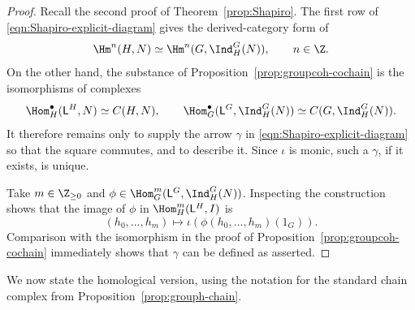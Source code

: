 \begin{proof}
	Recall the second proof of Theorem~\ref{prop:Shapiro}. The first row of
	\eqref{eqn:Shapiro-explicit-diagram} gives the derived-category form of
	\[ \Hm^n(H,N)\simeq\Hm^n(G,\Ind^G_H(N)),\qquad n\in\Z. \]
	On the other hand, the substance of
	Proposition~\ref{prop:groupcoh-cochain} is the isomorphisms of complexes
	\[ \Hom^\bullet_H(\mathsf{L}^H,N)\simeq C(H,N),\qquad
	\Hom^\bullet_G(\mathsf{L}^G,\Ind^G_H(N))
	\simeq C(G,\Ind^G_H(N)). \]
	It therefore remains only to supply the arrow $\gamma$ in
	\eqref{eqn:Shapiro-explicit-diagram} so that the square commutes, and to
	describe it. Since $\iota$ is monic, such a $\gamma$, if it exists, is
	unique.

	Take $m\in\Z_{\geq0}$ and
	$\phi\in\Hom^m_G(\mathsf{L}^G,\Ind^G_H(N))$. Inspecting the construction
	shows that the image of $\phi$ in $\Hom^m_H(\mathsf{L}^H,I)$ is
	\[ (h_0,\ldots,h_m)\mapsto
	\iota\left(\phi(h_0,\ldots,h_m)(1_G)\right). \]
	Comparison with the isomorphism in the proof of
	Proposition~\ref{prop:groupcoh-cochain} immediately shows that $\gamma$
	can be defined as asserted.
\end{proof}

We now state the homological version, using the notation for the standard
chain complex from Proposition~\ref{prop:grouph-chain}.

